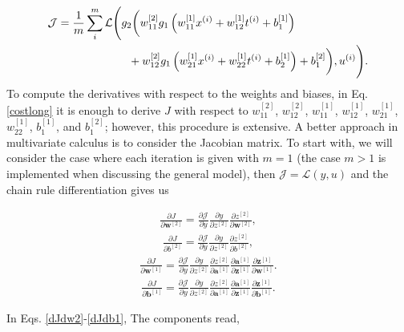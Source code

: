 \documentclass{article}
\begin{document}
\begin{align}
\mathcal{J}&=\frac{1}{m}\sum_i^m \mathcal{L}\Bigg{(}
g_2\bigg{(}w_{11}^{[2]} g_1\left(w_{11}^{[1]} x^{(i)} + w_{12}^{[1]} t^{(i)} + b_1^{[1]}\right) \nonumber \\ &~~~~~~~~~~~~~~~~~~~ +w_{12}^{[2]} g_1\left(w_{21}^{[1]} x^{(i)} + w_{22}^{[1]} t^{(i)} + b_2^{[1]}\right) + b_1^{[2]}\bigg{)}
,u^{(i)}\Bigg{)}.
\label{costlong} 
\end{align}
To compute the derivatives with respect to the weights and biases, in Eq. \eqref{costlong} it is enough to derive $J$ with respect to $w_{11}^{[2]}$, $w_{12}^{[2]}$, $w_{11}^{[1]}$, $w_{12}^{[1]}$, $w_{21}^{[1]}$, $w_{22}^{[1]}$, $b_1^{[1]}$, and $b_1^{[2]}$; however, this procedure is extensive. A better approach in multivariate calculus is to consider the Jacobian matrix. To start with, we will consider the case where each iteration is given with $m=1$ (the case $m>1$ is implemented when discussing the general model), then 
$\mathcal{J}= \mathcal{L}(y,u)$ and the chain rule differentiation gives us

\begin{align}
\label{dJdw2}
\frac{\partial J}{\partial \textbf{w}^{[2]}} = \frac{\partial \mathcal{J}}{\partial y} \frac{\partial y}{\partial z^{[2]}} \frac{\partial z^{[2]}}{\partial \textbf{w}^{[2]}},
\end{align}
\begin{align}
\frac{\partial J}{\partial b^{[2]}} =  \frac{\partial \mathcal{J}}{\partial y} \frac{\partial y}{\partial z^{[2]}} \frac{\partial z^{[2]}}{\partial {b}^{[2]}},
\end{align}
\begin{align}
\frac{\partial J}{\partial \textbf{w}^{[1]}} = \frac{\partial \mathcal{J}}{\partial y} \frac{\partial y}{\partial z^{[2]}} \frac{\partial z^{[2]}}{\partial \textbf{a}^{[1]}} \frac{\partial \textbf{a}^{[1]}}{\partial \textbf{z}^{[1]}}  \frac{\partial \textbf{z}^{[1]}}{\partial \textbf{w}^{[1]}}. 
\end{align}
\begin{align}
\label{dJdb1}
\frac{\partial J}{\partial \textbf{b}^{[1]}} =  \frac{\partial \mathcal{J}}{\partial y} \frac{\partial y}{\partial z^{[2]}} \frac{\partial z^{[2]}}{\partial \textbf{a}^{[1]}} \frac{\partial \textbf{a}^{[1]}}{\partial \textbf{z}^{[1]}}  \frac{\partial \textbf{z}^{[1]}}{\partial \textbf{b}^{[1]}}.
\end{align}

In Eqs. \eqref{dJdw2}-\eqref{dJdb1}, The components read,
\end{document}
